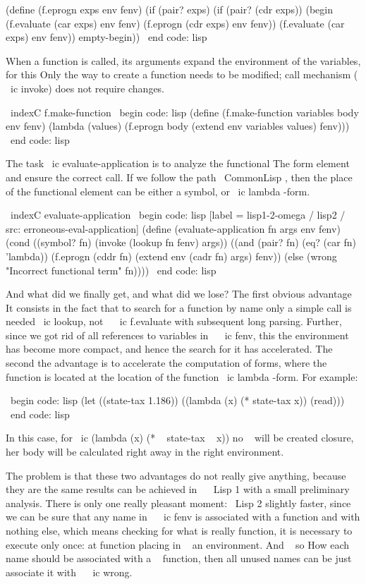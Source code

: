 {(define (f.eprogn exps env fenv)
  (if (pair? exps)
    (if (pair? (cdr exps))
        (begin (f.evaluate (car exps) env fenv)
               (f.eprogn (cdr exps) env fenv))
        (f.evaluate (car exps) env fenv))
    empty-begin))
\ end {code: lisp}

When a function is called, its arguments expand the environment of the variables, for this
Only the way to create a function needs to be modified; call mechanism
( \ ic {invoke}) does not require changes.

\ indexC {f.make-function}
\ begin {code: lisp}
(define (f.make-function variables body env fenv)
  (lambda (values)
    (f.eprogn body (extend env variables values) fenv)))
\ end {code: lisp}

The task \ ic {evaluate-application} is to analyze the functional
The form element and ensure the correct call. If we follow the path
{ \ CommonLisp }, then the place of the functional element can be either a symbol,
or \ ic {lambda} -form.

\ indexC {evaluate-application}
\ begin {code: lisp} [label = lisp1-2-omega / lisp2 / src: erroneous-eval-application]
(define (evaluate-application fn args env fenv)
  (cond ((symbol? fn)
         (invoke (lookup fn fenv) args))
        ((and (pair? fn) (eq? (car fn) 'lambda))
         (f.eprogn (cddr fn)
                   (extend env (cadr fn) args)
                   fenv))
        (else (wrong "Incorrect functional term" fn))))
\ end {code: lisp}

And what did we finally get, and what did we lose? The first obvious advantage
It consists in the fact that to search for a function by name only a simple call is needed
\ ic {lookup}, not ~ \ ic {f.evaluate} with subsequent long parsing.
Further, since we got rid of all references to variables in ~ \ ic {fenv}, this
the environment has become more compact, and hence the search for it has accelerated. The second
the advantage is to accelerate the computation of forms, where the function is located at the location of the function
\ ic {lambda} -form. For example:

\ begin {code: lisp}
(let ((state-tax 1.186))
  ((lambda (x) (* state-tax x)) (read)))
\ end {code: lisp}

In this case, for \ ic {(lambda (x) (* ~ state-tax ~ x))} no ~ will be created
closure, her body will be calculated right away in the right environment.

The problem is that these two advantages do not really give anything, because they are the same
results can be achieved in ~ \ Lisp 1 with a small preliminary
analysis. There is only one really pleasant moment: \ Lisp 2 slightly
faster, since we can be sure that any name in ~ \ ic {fenv} is associated
with a function and with nothing else, which means checking for what is really
function, it is necessary to execute only once: at function placing in ~ an environment. And ~ so
How each name should be associated with a ~ function, then all unused names can be
just associate it with ~ \ ic {wrong}.

}
